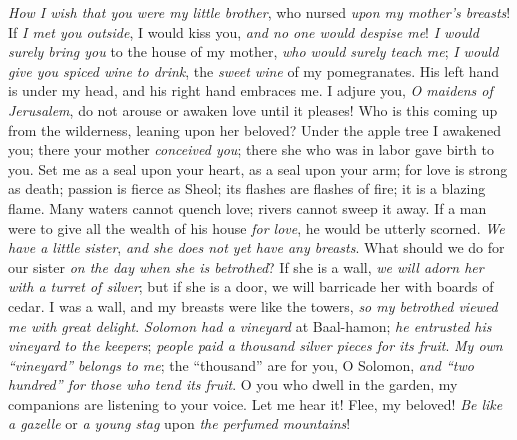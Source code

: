 \begin{biblechapter} %
 \textit{How I wish that you were my little brother}, 
who nursed \textit{upon my mother’s breasts}! 
If \textit{I met you outside}, I would kiss you, 
\textit{and no one would despise me}!
\verse \textit{I would surely bring you} to the house of my mother, 
\textit{who would surely teach me}; 
\textit{I would give you spiced wine to drink}, 
the \textit{sweet wine} of my pomegranates.
 His left hand is under my head, 
and his right hand embraces me.
\verse I adjure you, \textit{O maidens of Jerusalem}, 
do not arouse or awaken love until it pleases!
 Who is this coming up from the wilderness, 
leaning upon her beloved? 
Under the apple tree I awakened you; 
there your mother \textit{conceived you}; 
there she who was in labor gave birth to you.
 Set me as a seal upon your heart, 
as a seal upon your arm; 
for love is strong as death; 
passion is fierce as Sheol; 
its flashes are flashes of fire; 
it is a blazing flame.
\verse Many waters cannot quench love; 
rivers cannot sweep it away. 
If a man were to give all the wealth of his house \textit{for love}, 
he would be utterly scorned.
 \textit{We have a little sister}, 
\textit{and she does not yet have any breasts}. 
What should we do for our sister 
\textit{on the day when she is betrothed}?
\verse If she is a wall, 
\textit{we will adorn her with a turret of silver}; 
but if she is a door, 
we will barricade her with boards of cedar.
\verse I was a wall, and my breasts were like the towers, 
\textit{so my betrothed viewed me with great delight}.
 \textit{Solomon had a vineyard} at Baal-hamon; 
\textit{he entrusted his vineyard to the keepers}; 
\textit{people paid a thousand silver pieces for its fruit}.
\verse \textit{My own “vineyard” belongs to me}; 
the “thousand” are for you, O Solomon, 
\textit{and “two hundred” for those who tend its fruit}.
 O you who dwell in the garden, 
my companions are listening to your voice. 
Let me hear it!
\verse Flee, my beloved! 
\textit{Be like a gazelle} or \textit{a young stag} 
upon \textit{the perfumed mountains}!
\end{biblechapter}

